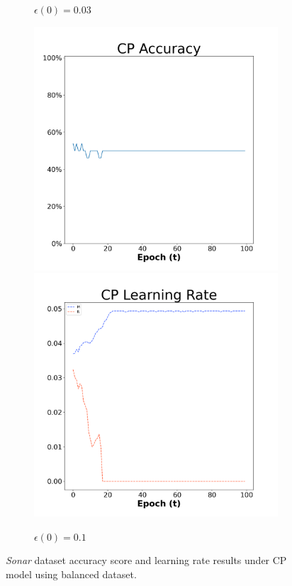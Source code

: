 \begin{figure}[H]
\begin{subfigure}{0.3\textwidth}
  \caption{$\epsilon(0)=0.03$}
\end{subfigure}\hfil %
\begin{subfigure}{0.3\textwidth}
  \includegraphics[width=\linewidth]{images/exper1/Sonar/CP_0.1_acc.png}
  \includegraphics[width=\linewidth]{images/exper1/Sonar/CP_0.1_lr.png}
  \caption{$\epsilon(0)=0.1$}
\end{subfigure}

\caption{\textit{Sonar} dataset accuracy score and learning rate results under CP model using balanced dataset.}
\end{figure}

